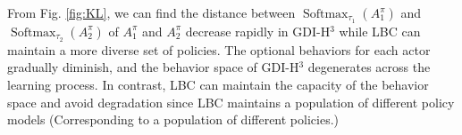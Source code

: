 \begin{figure*}[!ht]
\vspace{-0.1in}

 
\caption{KL Divergence of GDI-H$^3$ and LBC in Chopper Command (Smoothed by 0.9 for the ease of reading).}
\label{fig:KL}
\end{figure*}

From Fig. \ref{fig:KL}, we can find the distance between $\operatorname{
Softmax
}_{\tau_1}(A_1^{\pi})$ and $\operatorname{
Softmax
}_{\tau_2}(A_2^{\pi})$ of $A_1^\pi$ and $A_2^\pi$ decrease rapidly in GDI-H$^3$ while LBC can maintain a more diverse set of policies. The optional behaviors for each actor gradually diminish, and the behavior space of GDI-H$^3$ degenerates across the learning process. In contrast, LBC can maintain the capacity of the behavior space and avoid degradation since LBC maintains a population of different policy models (Corresponding to a population of different policies.)






